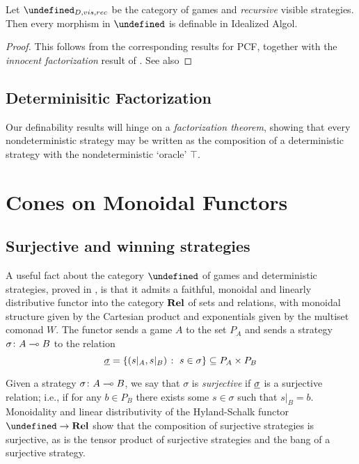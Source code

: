 \documentclass[sigplan,10pt,review]{acmart}\settopmatter{printfolios=true,printccs=false,printacmref=false}
\let\G\undefined
\begin{document}
\begin{proposition}
  Let $\G_{D,vis,rec}$ be the category of games and \emph{recursive} visible strategies.  
  Then every morphism in $\G$ is definable in Idealized Algol.
\end{proposition}
\begin{proof}
  This follows from the corresponding results for PCF, together with the \emph{innocent factorization} result of \cite{SamsonGuyIAPassive}.  
  See also 
\end{proof}

\subsection{Determinisitic Factorization}

Our definability results will hinge on a \emph{factorization theorem}, showing that every nondeterministic strategy may be written as the composition of a deterministic strategy with the nondeterministic `oracle' $\top$.  


\section{Cones on Monoidal Functors}

\subsection{Surjective and winning strategies}

A useful fact about the category $\G$ of games and deterministic strategies, proved in \cite{hylandSchalkGames}, is that it admits a faithful, monoidal and linearly distributive functor into the category ${\normalfont\textbf{Rel}}$ of sets and relations, with monoidal structure given by the Cartesian product and exponentials given by the multiset comonad $W$.  
The functor sends a game $A$ to the set $P_A$ and sends a strategy $\sigma\colon A\multimap B$ to the relation
\[
  \underline{\sigma}=\{(s\vert_A,s\vert_B)\;\colon\; s\in\sigma\}\subseteq P_A\times P_B
  \]

Given a strategy $\sigma\colon A\multimap B$, we say that $\sigma$ is \emph{surjective} if $\underline{\sigma}$ is a surjective relation; i.e., if for any $b\in P_B$ there exists some $s\in\sigma$ such that $s\vert_B=b$.  
Monoidality and linear distributivity of the Hyland-Schalk functor $\G\to\Rel$ show that the composition of surjective strategies is surjective, as is the tensor product of surjective strategies and the bang of a surjective strategy.  
\end{document}
